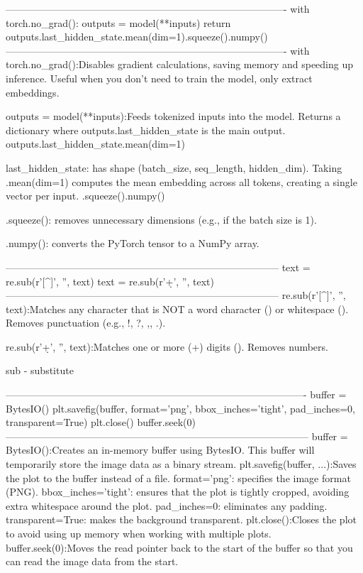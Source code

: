 -------------------------------------------------------------------------------------
 with torch.no_grad():
        outputs = model(**inputs)
    return outputs.last_hidden_state.mean(dim=1).squeeze().numpy()
-------------------------------------------------------------------------------------
with torch.no_grad():Disables gradient calculations, saving memory and speeding up inference.
Useful when you don't need to train the model, only extract embeddings.

outputs = model(**inputs):Feeds tokenized inputs into the model.
Returns a dictionary where outputs.last_hidden_state is the main output.
outputs.last_hidden_state.mean(dim=1)

last_hidden_state: has shape (batch_size, seq_length, hidden_dim).
Taking .mean(dim=1) computes the mean embedding across all tokens, creating a single vector per input.
.squeeze().numpy()

.squeeze(): removes unnecessary dimensions (e.g., if the batch size is 1).

.numpy(): converts the PyTorch tensor to a NumPy array.

-----------------------------------------------------------------------------------
text = re.sub(r'[^\w\s]', '', text)
text = re.sub(r'\d+', '', text)
-----------------------------------------------------------------------------------
re.sub(r'[^\w\s]', '', text):Matches any character that is NOT a word character (\w) or whitespace (\s).
Removes punctuation (e.g., !, ?, ,, .).

re.sub(r'\d+', '', text):Matches one or more (+) digits (\d).
Removes numbers.

sub - substitute

-------------------------------------------------------------------------------------------
buffer = BytesIO()
plt.savefig(buffer, format='png', bbox_inches='tight', pad_inches=0, transparent=True)
plt.close()
buffer.seek(0)
--------------------------------------------------------------------------------------------
buffer = BytesIO():Creates an in-memory buffer using BytesIO. This buffer will temporarily store the image data as a binary stream.
plt.savefig(buffer, ...):Saves the plot to the buffer instead of a file.
format='png': specifies the image format (PNG).
bbox_inches='tight': ensures that the plot is tightly cropped, avoiding extra whitespace around the plot.
pad_inches=0: eliminates any padding.
transparent=True: makes the background transparent.
plt.close():Closes the plot to avoid using up memory when working with multiple plots.
buffer.seek(0):Moves the read pointer back to the start of the buffer so that you can read the image data from the start.

